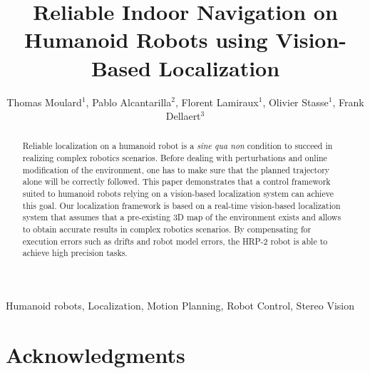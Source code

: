 \documentclass[a4paper, 10pt, conference]{ieeeconf}
\title{\LARGE \bf Reliable Indoor Navigation on Humanoid Robots using
  Vision-Based Localization}
\author{Thomas Moulard$^{1}$, Pablo Alcantarilla$^{2}$, Florent Lamiraux$^{1}$, Olivier Stasse$^{1}$, Frank Dellaert$^{3}$}%
\begin{document}
\maketitle
\thispagestyle{empty}
\pagestyle{empty}


\begin{abstract}
Reliable localization on a humanoid robot is a \textit{sine qua non} condition to succeed in realizing complex robotics scenarios. Before dealing with perturbations and online modification of the environment, one has to make sure that the planned trajectory alone will be correctly followed. This paper demonstrates that a control framework suited to humanoid robots relying on a vision-based localization system can achieve this goal. Our localization framework is based on a real-time vision-based localization system that assumes that a pre-existing 3D map of the environment exists and allows to obtain accurate results in complex robotics scenarios. By compensating for execution errors such as drifts and robot model errors, the HRP-2 robot is able to achieve high precision tasks. 
\end{abstract}

\begin{keywords}
  Humanoid robots, Localization, Motion Planning, Robot Control, Stereo Vision
\end{keywords}








\section*{Acknowledgments}



\end{document}
